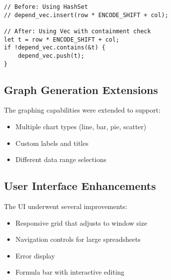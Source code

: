 \documentclass[12pt]{article}
\begin{document}
\begin{lstlisting}[caption={Optimized dependency tracking with Vec}]
// Before: Using HashSet
// depend_vec.insert(row * ENCODE_SHIFT + col);

// After: Using Vec with containment check
let t = row * ENCODE_SHIFT + col;
if !depend_vec.contains(&t) {
    depend_vec.push(t);
}
\end{lstlisting}

\subsection{Graph Generation Extensions}
The graphing capabilities were extended to support:
\begin{itemize}
    \item Multiple chart types (line, bar, pie, scatter)
    \item Custom labels and titles
    \item Different data range selections
\end{itemize}

\subsection{User Interface Enhancements}
The UI underwent several improvements:
\begin{itemize}
    \item Responsive grid that adjusts to window size
    \item Navigation controls for large spreadsheets
    \item Error display 
    \item Formula bar with interactive editing
\end{itemize}

\vfill
\end{document}
